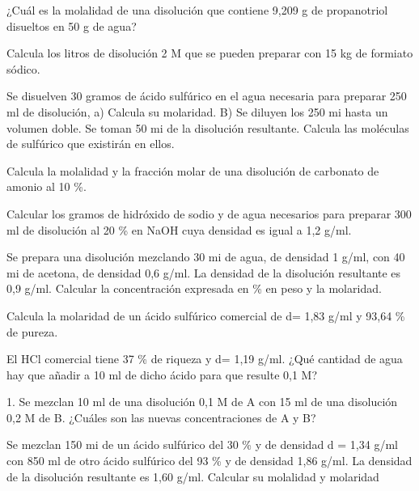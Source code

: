 \begin{multicols}{2}
\begin{problem}
¿Cuál es la molalidad de una disolución que contiene 9,209 g de propanotriol disueltos en 50 g de agua?
\end{problem}
\begin{problem}
Calcula los litros de disolución 2 M que se pueden preparar con 15 kg de formiato sódico.
\end{problem}
\begin{problem}
Se disuelven 30 gramos de ácido sulfúrico en el agua necesaria para preparar 250 ml de disolución, a) Calcula su molaridad. B) Se diluyen los 250 mi hasta un volumen doble. Se toman 50 mi de la disolución resultante. Calcula las moléculas de sulfúrico que existirán en ellos.	
\end{problem}
\begin{problem}
Calcula la molalidad y la fracción molar de una disolución de carbonato de amonio al 10 \%.
\end{problem}
\begin{problem}
Calcular los gramos de hidróxido de sodio y de agua necesarios para preparar 300 ml de disolución al 20 \% en NaOH cuya densidad es igual a 1,2 g/ml.	
\end{problem}
\begin{problem}
Se prepara una disolución mezclando 30 mi de agua, de densidad 1 g/ml, con 40 mi de acetona, de densidad 0,6 g/ml. La densidad de la disolución resultante es 0,9 g/ml. Calcular la concentración expresada en \% en peso y la molaridad.
\end{problem}
\begin{problem}
Calcula la molaridad de un ácido sulfúrico comercial de d= 1,83 g/ml y 93,64 \% de pureza.
\end{problem}
\begin{problem}
El HCl comercial tiene 37 \% de riqueza y d= 1,19 g/ml. ¿Qué cantidad de agua hay que añadir a 10 ml de dicho ácido para que resulte 0,1 M?
\end{problem}
\begin{problem}
1.	Se mezclan 10 ml de una disolución 0,1 M de A con 15 ml de una disolución 0,2 M de B. ¿Cuáles son las nuevas concentraciones de A y B?	
\end{problem}
\begin{problem}
Se mezclan 150 mi de un ácido sulfúrico del 30 \% y de densidad d = 1,34 g/ml con 850 ml de otro ácido sulfúrico del 93 \% y de densidad 1,86 g/ml. La densidad de la disolución resultante es 1,60 g/ml. Calcular su molalidad y molaridad	
\end{problem}
\begin{problem}

\end{problem}
\end{multicols}
